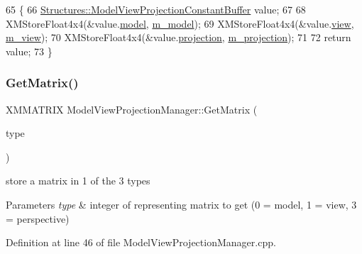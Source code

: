 \begin{DoxyCode}
65 \{
66     \mbox{\hyperlink{struct_structures_1_1_model_view_projection_constant_buffer}{Structures::ModelViewProjectionConstantBuffer}} value;
67 
68     XMStoreFloat4x4(&value.\mbox{\hyperlink{struct_structures_1_1_model_view_projection_constant_buffer_adcf32ccfcc0913db019de696791d6333}{model}}, \mbox{\hyperlink{class_model_view_projection_manager_af5b11770293ecea8efcddb473532270d}{m\_model}});
69     XMStoreFloat4x4(&value.\mbox{\hyperlink{struct_structures_1_1_model_view_projection_constant_buffer_aede4441ba5f179e090eb088d735ffd34}{view}}, \mbox{\hyperlink{class_model_view_projection_manager_a67704be9c327d11ef3b04b9d535ce5bf}{m\_view}});
70     XMStoreFloat4x4(&value.\mbox{\hyperlink{struct_structures_1_1_model_view_projection_constant_buffer_a515d9a03f96f1d6d35a0713b6fef0386}{projection}}, \mbox{\hyperlink{class_model_view_projection_manager_a133f02be971dd08a102883df4373b95d}{m\_projection}});
71 
72     \textcolor{keywordflow}{return} value;
73 \}
\end{DoxyCode}
\mbox{\label{class_model_view_projection_manager_a2ae680d4b31b2cb4775e91fc2dfbad70}} 
\subsubsection{\texorpdfstring{Get\+Matrix()}{GetMatrix()}}
{\footnotesize\ttfamily X\+M\+M\+A\+T\+R\+IX Model\+View\+Projection\+Manager\+::\+Get\+Matrix (\begin{DoxyParamCaption}\item[{U\+I\+NT}]{type }\end{DoxyParamCaption})}



store a matrix in 1 of the 3 types 


\begin{DoxyParams}{Parameters}
{\em type} & integer of representing matrix to get (0 = model, 1 = view, 3 = perspective) \\
\hline
\end{DoxyParams}


Definition at line 46 of file Model\+View\+Projection\+Manager.\+cpp.



